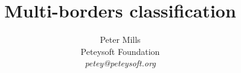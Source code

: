 \documentclass[11pt]{article}
\begin{document}
\renewcommand{\mathbf} \vec


\title{Multi-borders classification}

\author{Peter Mills\\
Peteysoft Foundation\\
\textit{petey@peteysoft.org}
}

\maketitle

\begin{abstract}

\end{abstract}





\end{document}

